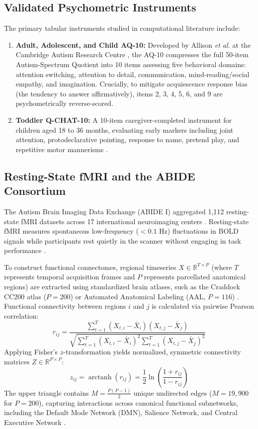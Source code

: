\documentclass[journal]{IEEEtran}
\begin{document}
\subsection{Validated Psychometric Instruments}
The primary tabular instruments studied in computational literature include:
\begin{enumerate}
    \item \textbf{Adult, Adolescent, and Child AQ-10:} Developed by Allison \textit{et al.} at the Cambridge Autism Research Centre \cite{allison2012toward}, the AQ-10 compresses the full 50-item Autism-Spectrum Quotient into 10 items assessing five behavioral domains: attention switching, attention to detail, communication, mind-reading/social empathy, and imagination. Crucially, to mitigate acquiescence response bias (the tendency to answer affirmatively), items 2, 3, 4, 5, 6, and 9 are psychometrically reverse-scored.
    \item \textbf{Toddler Q-CHAT-10:} A 10-item caregiver-completed instrument for children aged 18 to 36 months, evaluating early markers including joint attention, protodeclarative pointing, response to name, pretend play, and repetitive motor mannerisms \cite{auyeung2008quantitative}.
\end{enumerate}

\subsection{Resting-State fMRI and the ABIDE Consortium}
The Autism Brain Imaging Data Exchange (ABIDE I) aggregated 1,112 resting-state fMRI datasets across 17 international neuroimaging centers \cite{dimartino2014abide}. Resting-state fMRI measures spontaneous low-frequency ($<0.1$ Hz) fluctuations in BOLD signals while participants rest quietly in the scanner without engaging in task performance \cite{fox2007spontaneous}.

To construct functional connectomes, regional timeseries $X \in \mathbb{R}^{T \times P}$ (where $T$ represents temporal acquisition frames and $P$ represents parcellated anatomical regions) are extracted using standardized brain atlases, such as the Craddock CC200 atlas ($P = 200$) \cite{craddock2009disease} or Automated Anatomical Labeling (AAL, $P = 116$) \cite{tzourio2002automated}. Functional connectivity between regions $i$ and $j$ is calculated via pairwise Pearson correlation:
\begin{equation}
r_{ij} = \frac{\sum_{t=1}^T (X_{t,i} - \bar{X}_i)(X_{t,j} - \bar{X}_j)}{\sqrt{\sum_{t=1}^T (X_{t,i} - \bar{X}_i)^2 \sum_{t=1}^T (X_{t,j} - \bar{X}_j)^2}}
\end{equation}
Applying Fisher's $z$-transformation yields normalized, symmetric connectivity matrices $Z \in \mathbb{R}^{P \times P}$:
\begin{equation}
z_{ij} = \operatorname{arctanh}(r_{ij}) = \frac{1}{2} \ln \left(\frac{1 + r_{ij}}{1 - r_{ij}}\right)
\end{equation}
The upper triangle contains $M = \frac{P(P-1)}{2}$ unique undirected edges ($M = 19,900$ for $P = 200$), capturing interactions across canonical functional subnetworks, including the Default Mode Network (DMN), Salience Network, and Central Executive Network \cite{yeo2011organization}.
\end{document}
